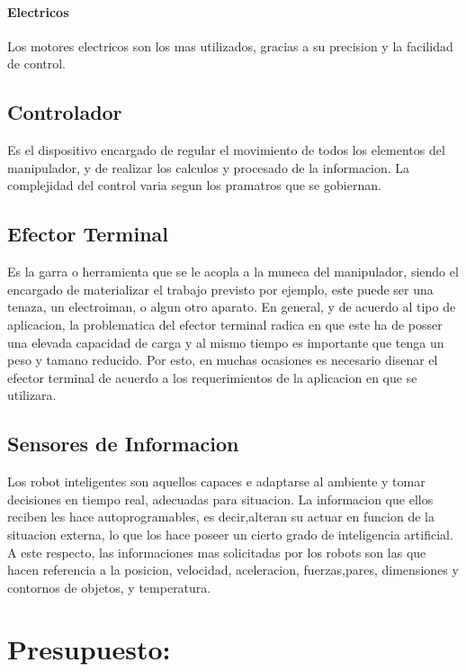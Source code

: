 \documentclass[14pt,a4paper]{article}
\begin{document}
\paragraph{Electricos}
Los motores electricos son los mas utilizados, gracias a su precision y la facilidad de control.
\subsection{Controlador}
Es el dispositivo encargado de regular el movimiento de todos los elementos del manipulador, y de realizar los calculos y procesado de la informacion. La complejidad del control varia segun los pramatros que se gobiernan.
\subsection{Efector Terminal}
Es la garra o herramienta que se le acopla a la muneca del manipulador, siendo el encargado de materializar el trabajo previsto por ejemplo, este puede ser una tenaza, un electroiman, o algun otro aparato. En general, y de acuerdo al tipo de aplicacion, la problematica del efector terminal radica en que este ha de posser una elevada capacidad de carga y al mismo tiempo es importante que tenga un peso y tamano reducido. Por esto, en muchas ocasiones es necesario disenar el efector terminal de acuerdo a los requerimientos de la aplicacion en que se utilizara.
\subsection{Sensores de Informacion}
Los robot inteligentes son aquellos capaces e adaptarse al ambiente y tomar decisiones en tiempo real, adecuadas para situacion. La informacion que ellos reciben les hace autoprogramables, es decir,alteran su actuar en funcion de la situacion externa, lo que los hace poseer un cierto grado de inteligencia artificial. A este respecto, las informaciones mas solicitadas por los robots son las que hacen referencia a la posicion, velocidad, aceleracion, fuerzas,pares, dimensiones y contornos de objetos, y temperatura.

\section{Presupuesto:}
\end{document}
